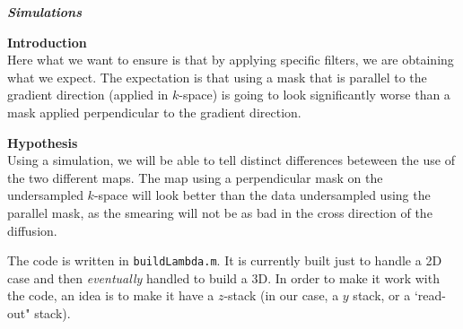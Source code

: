 \documentclass[pra,11 pt]{revtex4-1}
\newcommand{\bo}{\noindent\textbf}
\begin{document}
\newpage
\bo{\emph{Simulations}}

\bo{Introduction}\\
Here what we want to ensure is that by applying specific filters, we are obtaining what we expect. The expectation is that using a mask that is parallel to the gradient direction (applied in $k$-space) is going to look significantly worse than a mask applied perpendicular to the gradient direction.

\bo{Hypothesis}\\
Using a simulation, we will be able to tell distinct differences beteween the use of the two different maps. The map using a perpendicular mask on the undersampled $k$-space will look better than the data undersampled using the parallel mask, as the smearing will not be as bad in the cross direction of the diffusion.

The code is written in \verb!buildLambda.m!. It is currently built just to handle a 2D case and then \emph{eventually} handled to build a 3D. In order to make it work with the code, an idea is to make it have a $z$-stack (in our case, a $y$ stack, or a `read-out" stack). 
\end{document}
